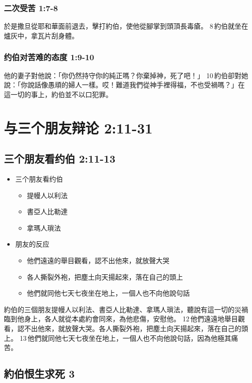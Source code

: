 \subsubsection{二次受苦 1:7-8}
於是撒旦從耶和華面前退去，擊打約伯，使他從腳掌到頭頂長毒瘡。 8 約伯就坐在爐灰中，拿瓦片刮身體。 


\subsubsection{约伯对苦难的态度 1:9-10}
他的妻子對他說：「你仍然持守你的純正嗎？你棄掉神，死了吧！」 10 約伯卻對她說：「你說話像愚頑的婦人一樣。哎！難道我們從神手裡得福，不也受禍嗎？」在這一切的事上，約伯並不以口犯罪。

\section{与三个朋友辩论 2:11-31}
\subsection{三个朋友看约伯 2:11-13}
\begin{itemize}
\itemsep-.45em  
\item 三个朋友看约伯
\begin{itemize}
\itemsep-.35em  
\item 提幔人以利法
\item 書亞人比勒達
\item 拿瑪人瑣法
\end{itemize}
\item 朋友的反应
\begin{itemize}
\itemsep-.35em  
\item 他們遠遠的舉目觀看，認不出他來，就放聲大哭
\item 各人撕裂外袍，把塵土向天揚起來，落在自己的頭上
\item 他們就同他七天七夜坐在地上，一個人也不向他說句話
\end{itemize}
\end{itemize}
約伯的三個朋友提幔人以利法、書亞人比勒達、拿瑪人瑣法，聽說有這一切的災禍臨到他身上，各人就從本處約會同來，為他悲傷，安慰他。 12 他們遠遠地舉目觀看，認不出他來，就放聲大哭。各人撕裂外袍，把塵土向天揚起來，落在自己的頭上。 13 他們就同他七天七夜坐在地上，一個人也不向他說句話，因為他極其痛苦。

\subsection{約伯恨生求死 3}
